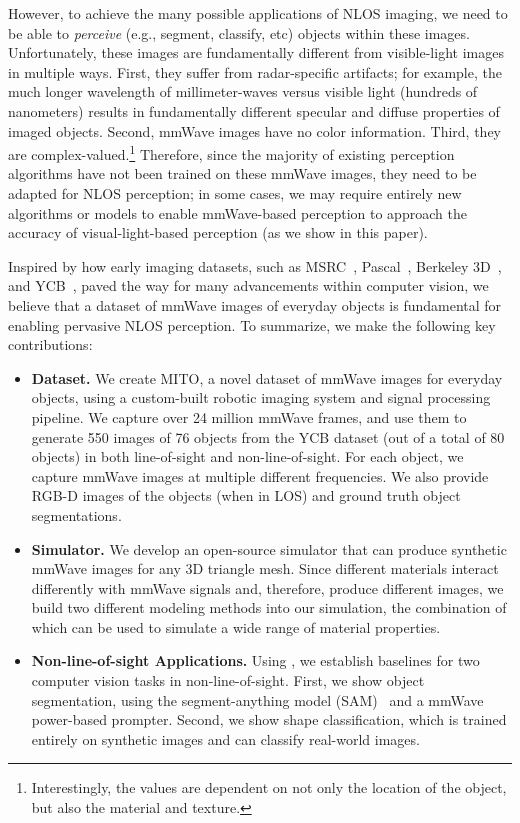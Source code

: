 However, to achieve the many possible applications of NLOS imaging, we need to be able to \textit{perceive} (e.g., segment, classify, etc) objects within these images. Unfortunately, these images are fundamentally different from visible-light images in multiple ways. First, they suffer from radar-specific artifacts; for example, the much longer wavelength of millimeter-waves versus visible light (hundreds of nanometers) results in fundamentally different specular and diffuse properties of imaged objects. Second, mmWave images have no color information. Third, they are complex-valued.\footnote{Interestingly, the values are dependent on not only the location of the object, but also the material and texture.} Therefore, since the majority of existing perception algorithms have not been trained on these mmWave images, 
they need to be adapted for NLOS perception; in some cases, we may require entirely new algorithms or models to enable mmWave-based perception to approach the accuracy of visual-light-based perception (as we show in this paper). 

Inspired by how early imaging datasets, such as MSRC~\cite{msrc_dataset}, Pascal~\cite{pascal_dataset}, Berkeley 3D~\cite{berkely_3d_dataset}, and YCB~\cite{ycb}, paved the way for many advancements within computer vision, we believe that a dataset of mmWave images of everyday objects is fundamental for enabling pervasive NLOS perception. To summarize, we make the following key contributions: 

\begin{itemize}

    \item \textbf{Dataset.} We create MITO, a novel dataset of mmWave images for everyday objects, using a custom-built robotic imaging system and signal processing pipeline. We capture over 24 million mmWave frames, and use them to generate 550 images of 76 objects from the YCB dataset (out of a total of 80 objects) in both line-of-sight and non-line-of-sight. For each object, we capture mmWave images at multiple different frequencies. We also provide RGB-D images of the objects (when in LOS) and ground truth object segmentations. 
    \item \textbf{Simulator.} We develop an open-source simulator that can produce synthetic mmWave images for any 3D triangle mesh. Since different materials interact differently with mmWave signals and, therefore, produce different images, we build two different modeling methods into our simulation, the combination of which can be used to simulate a wide range of material properties. 
    \item \textbf{Non-line-of-sight Applications. }Using \name, we establish baselines for two computer vision tasks {in non-line-of-sight}. First, we show object segmentation, using the segment-anything model (SAM)~\cite{sam} and a mmWave power-based prompter. Second, we show shape classification, which is trained entirely on synthetic images and can classify real-world images.
\end{itemize}

